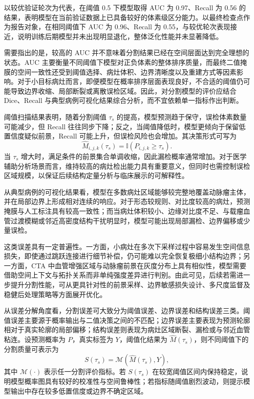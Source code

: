 以较优验证轮次为代表，在阈值 0.5 下模型取得 AUC 为 0.97、Recall 为 0.56 的结果，表明模型在当前验证数据上已具备较好的体素级区分能力。以最终检查点作为报告对象，在相同阈值下 AUC 为 0.96、Recall 为 0.55，与较优轮次表现接近，说明训练后期模型并未出现明显退化，整体泛化性能并未显著降低。

需要指出的是，较高的 AUC 并不意味着分割结果已经在空间层面达到完全理想的状态。AUC 主要衡量不同阈值下模型对正负体素的整体排序质量，而最终二值掩膜的空间一致性还受到阈值选择、病灶体积、边界清晰度以及重建方式等因素影响。对于小目标病灶而言，即便模型在概率排序层面表现良好，不合适的阈值仍可能导致边界收缩、局部断裂或离散误检区域。因此，对分割模型的评价应结合 Dice、Recall 与典型病例可视化结果综合分析，而不宜依赖单一指标作出判断。

阈值扫描结果表明，随着分割阈值 $\tau_s$ 的提高，模型预测趋于保守，误检体素数量可能减少，但 Recall 往往同步下降；反之，当阈值降低时，模型更倾向于保留低置信度疑似前景，Recall 可能上升，但误检风险也会增加。其决策形式可写为
\begin{equation}
\hat{M}_{i,j,k}(\tau_s)=\mathbb{I}\left(P_{i,j,k}\geq \tau_s\right).
\end{equation}
当 $\tau_s$ 增大时，满足条件的前景集合单调收缩，因此漏检概率通常增加。对于医学辅助分析场景而言，维持较高的病灶检出能力具有重要意义，但同时也需控制误检区域规模，以保证后续结构定量分析与临床展示的可解释性。

从典型病例的可视化结果看，模型在多数病灶区域能够较完整地覆盖动脉瘤主体，并在局部边界上形成相对连续的响应。对于形态较规则、对比度较高的病灶，预测掩膜与人工标注具有较高一致性；而当病灶体积较小、边缘对比度不足、与载瘤血管过渡模糊或邻近高密度结构干扰明显时，模型可能出现局部漏检、边界偏移或少量误检。

这类误差具有一定普遍性。一方面，小病灶在多次下采样过程中容易发生空间信息损失，即使通过跳跃连接进行细节补偿，仍可能难以完全恢复极细小结构边界；另一方面，CTA 中血管增强区域与动脉瘤前景在灰度分布上具有相似性，模型需要借助空间上下文与拓扑关系而非单纯强度差异进行判别。由此可见，后续若需进一步提升分割性能，可从更具针对性的前景采样、边界敏感损失设计、多尺度监督及稳健后处理策略等方面展开优化。

从误差分解角度看，分割误差可大致分为阈值误差、边界误差和结构误差三类。阈值误差主要源于概率输出与二值决策之间的不匹配；边界误差主要表现为预测轮廓相对于真实轮廓的局部偏移；结构误差则表现为病灶区域断裂、漏检或与邻近血管粘连。设预测概率为 $P$，真实标签为 $Y$，阈值化结果为 $\hat{M}(\tau_s)$，则不同阈值下的分割质量可表示为
\begin{equation}
S(\tau_s)=\mathcal{M}\left(\hat{M}(\tau_s),Y\right),
\end{equation}
其中 $\mathcal{M}(\cdot)$ 表示任一分割评价指标。若 $S(\tau_s)$ 在较宽阈值区间内保持稳定，说明模型概率图具有较好的校准性与空间鲁棒性；若指标随阈值剧烈波动，则提示模型输出中存在较多低置信度或边界不确定区域。

